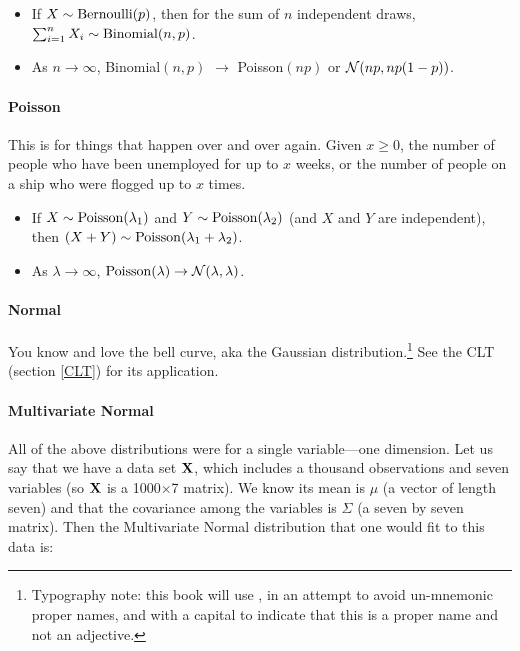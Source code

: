 \begin{itemize}
\item If $X \sim {\rm Bernoulli}(p)$, then for the sum of $n$ independent draws,
$\sum_{i=1}^n X_i \sim {\rm Binomial}(n,p)$.
\item As $n\to\infty$, Binomial$(n,p)$ $\to$ Poisson$(np)$ or ${\cal
N}(np, np(1-p))$.
\end{itemize}


\paragraph{Poisson}

This is for things that happen over and over again. Given $x\geq0$,
the number of people who have been unemployed for up to $x$ weeks,
or the number of people on a ship who were flogged up to $x$ times.

\begin{itemize}
\item If $X \sim {\rm Poisson}(\lambda_1)$ and $Y \sim {\rm
Poisson}(\lambda_2)$ (and $X$ and $Y$ are independent), then $(X + Y) \sim {\rm Poisson}(\lambda_1 +
\lambda_2)$.  \item As $\lambda\to\infty$,  ${\rm Poisson}(\lambda)
\to {\cal N}(\lambda, \lambda)$.  \end{itemize}

\paragraph{Normal}

You know and love the bell curve, aka the Gaussian
distribution.\footnote{Typography note: this book will use ,
in an attempt to avoid un-mnemonic proper names, and with a capital to indicate
that this is a proper name and not an adjective.} See the CLT (section
\ref{CLT}) for its application.


\paragraph{Multivariate Normal}
All of the above distributions were for a single variable---one
dimension. Let us say that we have a data set ${\bf X}$, which includes a
thousand observations and seven variables (so ${\bf X}$ is a 1000$\times$7
matrix). We know its mean is
$\mu$ (a vector of length seven) and that the covariance among the
variables is $\Sigma$ (a seven by seven matrix). Then the Multivariate
Normal distribution that one would fit to this data is:

